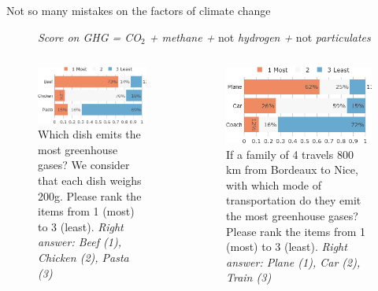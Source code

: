 \begin{framefont}{\small}
\begin{frame}{Not so many mistakes on the factors of climate change}
\begin{figure}[h!]
	\textit{Score on GHG = CO$_\text{2}$ + methane + }not\textit{ hydrogen + }not\textit{ particulates}
	\end{figure}
\end{frame}
	
	
\begin{frame}{}%
	\begin{columns}
	\begin{column}{0.5\textwidth}
	\begin{figure}
	\caption{Which dish emits the most greenhouse gases? We consider that each dish weighs 200g.
	Please rank the items from 1 (most) to 3 (least).
	\newline \footnotesize{\textit{Right answer: Beef (1), Chicken (2), Pasta (3)}}}
	\includegraphics[width=.43\paperwidth]{../figures/FR/footprint_food_FR.png}
	\end{figure}
	\end{column}
	\begin{column}{0.5\textwidth}
	\begin{figure}
	\caption{If a family of 4 travels 800 km from Bordeaux to Nice, with which mode of transportation do they emit the most greenhouse gases? 
	Please rank the items from 1 (most) to 3 (least).
	\newline \footnotesize{\textit{Right answer: Plane (1), Car (2), Train (3)}}} %
	\includegraphics[width=.43\paperwidth]{../figures/FR/footprint_transport_FR.png}
	\end{figure}
	\end{column}
	\end{columns}
\end{frame}
	

\end{framefont}
